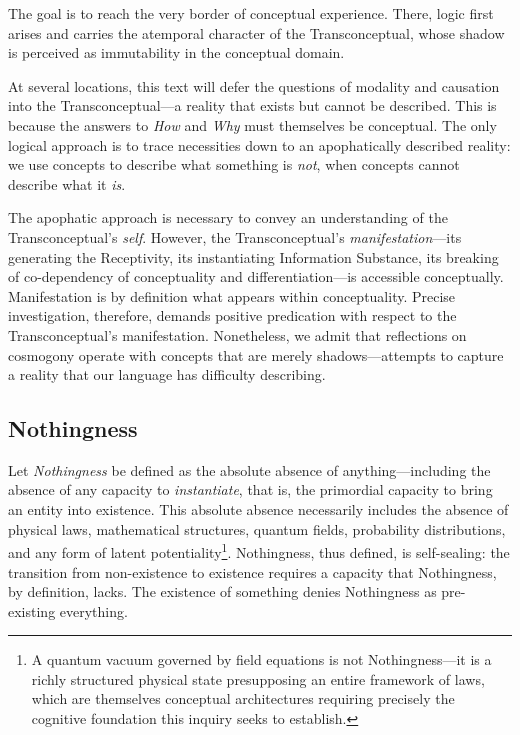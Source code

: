 \documentclass[11pt, a4paper]{article}
\theoremstyle{formalism}
\begin{document}
The goal is to reach the very border of conceptual experience. There, logic
first arises and carries the atemporal character of the Transconceptual, whose
shadow is perceived as immutability in the conceptual domain. 

At several locations, this text will defer the questions of modality and
causation into the Transconceptual---a reality that exists but cannot be
described. This is because the answers to \textit{How} and \textit{Why} must
themselves be conceptual. The only logical approach is to trace necessities
down to an apophatically described reality: we use concepts to describe what
something is \textit{not}, when concepts cannot describe what it \textit{is}.

The apophatic approach is necessary to convey an understanding of the
Transconceptual's \textit{self}. However, the Transconceptual's
\textit{manifestation}---its generating the Receptivity, its instantiating
Information Substance, its breaking of co-dependency of conceptuality and
differentiation---is accessible conceptually. Manifestation is by definition
what appears within conceptuality. Precise investigation, therefore, demands
positive predication with respect to the Transconceptual's manifestation.
Nonetheless, we admit that reflections on cosmogony operate with concepts that
are merely shadows---attempts to capture a reality that our language has
difficulty describing.

\subsection{Nothingness}

Let \textit{Nothingness} be defined as the absolute absence of
anything---including the absence of any capacity to \textit{instantiate}, that
is, the primordial capacity to bring an entity into existence. This absolute
absence necessarily includes the absence of physical laws, mathematical
structures, quantum fields, probability distributions, and any form of latent
potentiality\footnote{A quantum vacuum governed by field equations is not
Nothingness---it is a richly structured physical state presupposing an entire
framework of laws, which are themselves conceptual architectures requiring
precisely the cognitive foundation this inquiry seeks to establish.}.
Nothingness, thus defined, is self-sealing: the transition from non-existence
to existence requires a capacity that Nothingness, by definition, lacks.
The existence of something denies Nothingness as pre-existing everything.
\end{document}
